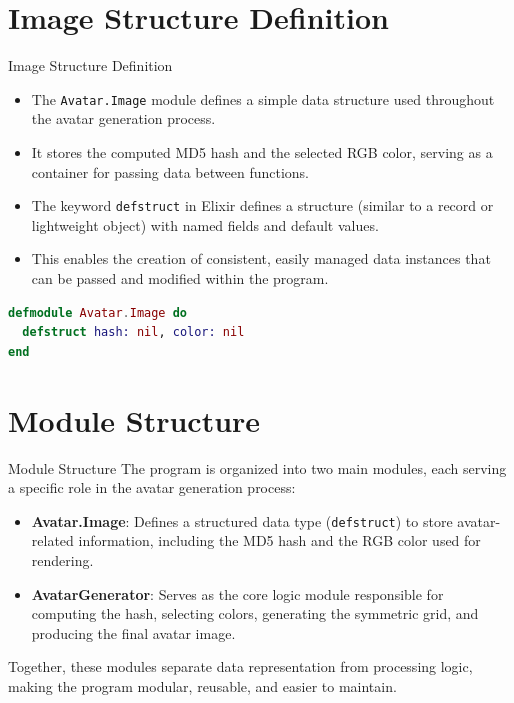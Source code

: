 \documentclass[aspectratio=169, table]{beamer}
\begin{document}
\section{Image Structure Definition}
\begin{frame}[fragile]{Image Structure Definition}
\vspace{20pt}
\small
\begin{itemize}
  \item The \texttt{Avatar.Image} module defines a simple data structure used throughout the avatar generation process.
  \item It stores the computed MD5 hash and the selected RGB color, serving as a container for passing data between functions.
  \item The keyword \texttt{defstruct} in Elixir defines a structure (similar to a record or lightweight object) with named fields and default values.
  \item This enables the creation of consistent, easily managed data instances that can be passed and modified within the program.
\end{itemize}

\begin{lstlisting}[language=Elixir, caption={Definition of src/image.ex}, basicstyle=\ttfamily\small]
defmodule Avatar.Image do
  defstruct hash: nil, color: nil
end
\end{lstlisting}
\end{frame}



\section{Module Structure}

\begin{frame}[fragile]{Module Structure}
\vspace{20pt}
\small
The program is organized into two main modules, each serving a specific role in the avatar generation process:

\begin{itemize}
  \item \textbf{Avatar.Image}:  
  Defines a structured data type (\texttt{defstruct}) to store avatar-related information, including the MD5 hash and the RGB color used for rendering.

  \item \textbf{AvatarGenerator}:  
  Serves as the core logic module responsible for computing the hash, selecting colors, generating the symmetric grid, and producing the final avatar image.
\end{itemize}

Together, these modules separate data representation from processing logic, making the program modular, reusable, and easier to maintain.
\end{frame}
\end{document}
